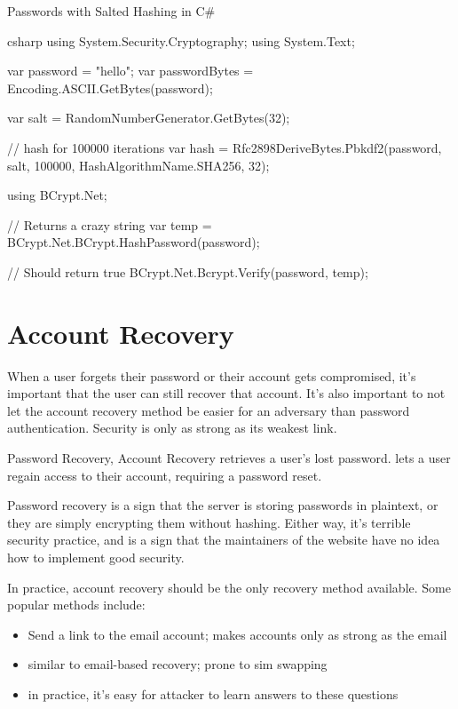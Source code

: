 \begin{codebox}{Passwords with Salted Hashing in C\#}{}{}
    \begin{amzcode}{csharp}
using System.Security.Cryptography;
using System.Text;

var password = "hello";
var passwordBytes = Encoding.ASCII.GetBytes(password);

var salt = RandomNumberGenerator.GetBytes(32);

// hash for 100000 iterations
var hash = Rfc2898DeriveBytes.Pbkdf2(password, salt, 100000, HashAlgorithmName.SHA256, 32);

using BCrypt.Net;

// Returns a crazy string
var temp = BCrypt.Net.BCrypt.HashPassword(password);

// Should return true
BCrypt.Net.Bcrypt.Verify(password, temp);
    \end{amzcode}
\end{codebox}

\section{Account Recovery}

When a user forgets their password or their account gets compromised, it's important that the user can still recover that account. It's also important to not let the account recovery method be easier for an adversary than password authentication. Security is only as strong as its weakest link.

\begin{dfnbox}{Password Recovery, Account Recovery}{}
     retrieves a user's lost password.  lets a user regain access to their account, requiring a password reset.
\end{dfnbox}

Password recovery is a sign that the server is storing passwords in plaintext, or they are simply encrypting them without hashing. Either way, it's terrible security practice, and is a sign that the maintainers of the website have no idea how to implement good security.

In practice, account recovery should be the only recovery method available. Some popular methods include:
\begin{itemize}[noitemsep]
    \item {} Send a link to the email account; makes accounts only as strong as the email
    \item {} similar to email-based recovery; prone to sim swapping
    \item {} in practice, it's easy for attacker to learn answers to these questions
\end{itemize}

